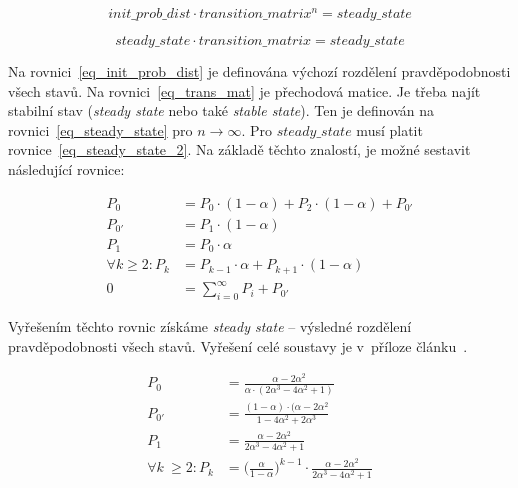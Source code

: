 \begin{equation}
    init\_prob\_dist \cdot transition\_matrix^{n} = steady\_state
    \label{eq_steady_state}
\end{equation}

\begin{equation}
    steady\_state \cdot transition\_matrix = steady\_state
    \label{eq_steady_state_2}
\end{equation}

Na rovnici~\ref{eq_init_prob_dist} je definována výchozí rozdělení pravděpodobnosti všech stavů. Na rovnici~\ref{eq_trans_mat} je přechodová matice. Je třeba najít stabilní stav (\textit{steady state} nebo také \textit{stable state}). Ten je definován na rovnici~\ref{eq_steady_state} pro $n \rightarrow \infty$. Pro $steady\_state$ musí platit rovnice~\ref{eq_steady_state_2}. Na základě těchto znalostí, je možné sestavit následující rovnice:

\begin{equation}
    \begin{aligned}
        P_0 &= P_0 \cdot (1 - \alpha) + P_2 \cdot (1 - \alpha) + P_{0'} \\
        P_{0'} &= P_1 \cdot (1 - \alpha) \\
        P_1 &= P_0 \cdot \alpha \\
        \forall k \geq 2 : P_k &= P_{k-1} \cdot \alpha + P_{k + 1} \cdot (1 - \alpha) \\
        0 &= \sum_{i=0}^\infty P_i + P_{0'}
    \end{aligned}
\end{equation}

Vyřešením těchto rovnic získáme \textit{steady state} -- výsledné rozdělení pravděpodobnosti všech stavů. Vyřešení celé soustavy je v~příloze článku~\cite{bib_paper}.

\begin{align}
    \label{eq_probabilities_1}
    P_0 &= \frac{\alpha - 2 \alpha^2}{\alpha \cdot (2 \alpha^3 - 4 \alpha^2 + 1)} \\
    \label{eq_probabilities_2}
    P_{0'} &= \frac{(1 - \alpha) \cdot (\alpha - 2 \alpha^2}{1 - 4 \alpha^2 + 2 \alpha^3} \\
    \label{eq_probabilities_3}
    P_1 &= \frac{\alpha - 2 \alpha^2}{2 \alpha^3 - 4 \alpha^2 + 1} \\
    \label{eq_probabilities_4}
    \forall k~\geq 2 : P_k &= \bigg( \frac{\alpha}{1 - \alpha} \bigg)^{k - 1} \cdot \frac{\alpha - 2 \alpha^2}{2\alpha^3 - 4\alpha^2 + 1}
\end{align}

